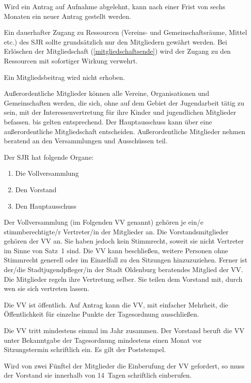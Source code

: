 \documentclass[10pt,a4paper,oneside,parskip=half]{scrartcl}
\begin{document}
\begin{contract}
Wird ein Antrag auf Aufnahme abgelehnt, kann nach einer Frist von sechs Monaten ein neuer Antrag gestellt werden.

Ein dauerhafter Zugang zu Ressourcen (Vereins- und Gemeinschaftsräume, Mittel etc.) des SJR sollte grundsätzlich nur den Mitgliedern gewährt werden. Bei Erlöschen der Mitgliedschaft (\ref{mitgliedschaftsende}) wird der Zugang zu den Ressourcen mit sofortiger Wirkung verwehrt.

Ein Mitgliedsbeitrag wird nicht erhoben.\label{mitgliedschaft_beitrag}

Außerordentliche Mitglieder können alle Vereine, Organisationen und Gemeinschaften werden, die sich, ohne auf dem Gebiet der Jugendarbeit tätig zu sein, mit der Interessenvertretung für ihre Kinder und jugendlichen Mitglieder befassen.  bis  gelten entsprechend. Der Hauptausschuss kann über eine außerordentliche Mitgliedschaft entscheiden. Außerordentliche Mitglieder nehmen beratend an den Versammlungen und Ausschüssen teil.

Der SJR hat folgende Organe:
\begin{enumerate}
\item Die Vollversammlung
\item Den Vorstand
\item Den Hauptausschuss
\end{enumerate}

Der Vollversammlung (im Folgenden VV genannt) gehören je ein/e stimmberechtigte/r Vertreter/in der Mitglieder an. Die Vorstandsmitglieder gehören der VV an. Sie haben jedoch kein Stimmrecht, soweit sie nicht Vertreter im Sinne von Satz~1 sind. Die VV kann beschließen, weitere Personen ohne Stimmrecht generell oder im Einzelfall zu den Sitzungen hinzuzuziehen. Ferner ist der/die Stadtjugendpfleger/in der Stadt Oldenburg beratendes Mitglied der VV. Die Mitglieder regeln ihre Vertretung selber. Sie teilen dem Vorstand mit, durch wen sie sich vertreten lassen.

Die VV ist öffentlich. Auf Antrag kann die VV, mit einfacher Mehrheit, die Öffentlichkeit für einzelne Punkte der Tagesordnung ausschließen.

Die VV tritt mindestens einmal im Jahr zusammen. Der Vorstand beruft die VV unter Bekanntgabe der Tagesordnung mindestens einen Monat vor Sitzungstermin schriftlich ein. Es gilt der Poststempel.

Wird von zwei Fünftel der Mitglieder die Einberufung der VV gefordert, so muss der Vorstand sie innerhalb von 14~Tagen schriftlich einberufen.


\end{contract}
\end{document}
